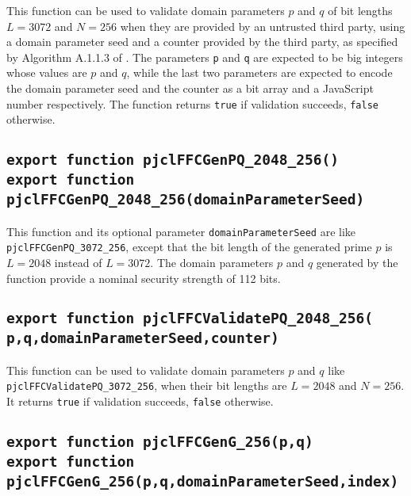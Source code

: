 \documentclass[12pt]{article}
\begin{document}
This function can be used to validate domain parameters $p$ and $q$
of bit lengths $L=3072$ and $N=256$
when they are provided by an untrusted third party, using a domain parameter seed and a counter provided
by the third party, as specified by Algorithm A.1.1.3 of \cite{DSS-4}.
The parameters {\tt p} and {\tt q} are expected to be big integers whose values are $p$ and $q$, 
while the last two parameters are expected to encode the domain parameter seed
and the counter as a bit array and a JavaScript number respectively.
The function returns {\tt true} if validation succeeds, {\tt false} otherwise.

\subsection{\tt export function pjclFFCGenPQ\_2048\_256()\\export function pjclFFCGenPQ\_2048\_256(domainParameterSeed)}

This function and its optional parameter {\tt domainParameterSeed} are
like {\tt pjclFFCGenPQ\_3072\_256}, except that the bit length
of the generated prime $p$ is $L=2048$ instead of $L=3072$.
The domain parameters $p$ and $q$ generated by the function
provide a nominal security strength of 112 bits.

\subsection{\tt export function pjclFFCValidatePQ\_2048\_256(\\\mbox{}\hspace{.2in}p,q,domainParameterSeed,counter)}

This function can be used to validate domain parameters $p$ and $q$ like
{\tt pjclFFCValidatePQ\_3072\_256}, when their bit lengths are $L=2048$ and $N=256$.
It returns {\tt true} if validation succeeds, {\tt false} otherwise.

\subsection{\tt export function pjclFFCGenG\_256(p,q)\\export function pjclFFCGenG\_256(p,q,domainParameterSeed,index)}
\end{document}
